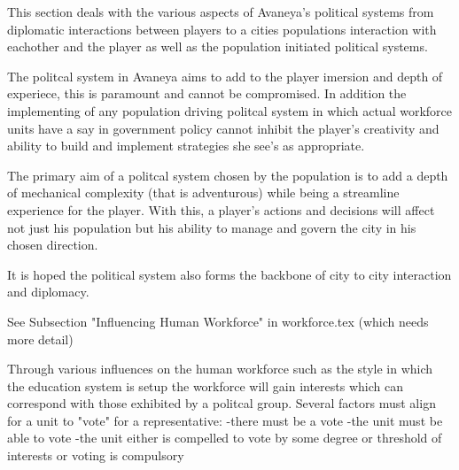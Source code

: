 


This section deals with the various aspects of Avaneya's political systems from diplomatic interactions between players to a cities populations interaction with eachother and the player as well as the population initiated political systems. 


The politcal system in Avaneya aims to add to the player imersion and depth of experiece, this is paramount and cannot be compromised. In addition the implementing of any population driving politcal system in which actual workforce units have a say in government policy cannot inhibit the player's creativity and ability to build and implement strategies she see's as appropriate.

The primary aim of a politcal system chosen by the population is to add a depth of mechanical complexity (that is adventurous) while being a streamline experience for the player. With this, a player's actions and decisions will affect not just his population but his ability to manage and govern the city in his chosen direction.

It is hoped the political system also forms the backbone of city to city interaction and diplomacy.

See Subsection "Influencing Human Workforce" in workforce.tex (which needs more detail)

Through various influences on the human workforce such as the style in which the education system is setup the workforce will gain interests which can correspond with those exhibited by a politcal group. Several factors must align for a unit to "vote" for a representative:
-there must be a vote
-the unit must be able to vote
-the unit either is compelled to vote by some degree or threshold of interests or voting is compulsory













